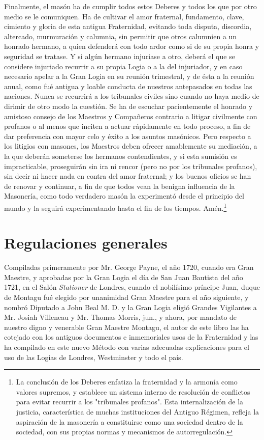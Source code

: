 \documentclass[a4paper,12pt,twoside]{book}
\newcommand{\manuscritosection}[1]{%
\section*{#1}
\addcontentsline{toc}{section}{#1}
}
\begin{document}
\noindent Finalmente, el masón ha de cumplir todos estos Deberes y todos los que por otro medio se le comuniquen. Ha de cultivar el amor fraternal, fundamento, clave, cimiento y gloria de esta antigua Fraternidad, evitando toda disputa, discordia, altercado, murmuración y calumnia, sin permitir que otros calumnien a un honrado hermano, a quien defenderá con todo ardor como si de su propia honra y seguridad se tratase. Y si algún hermano injuriase a otro, deberá el que se considere injuriado recurrir a su propia Logia o a la del injuriador, y en caso necesario apelar a la Gran Logia en su reunión trimestral, y de ésta a la reunión anual, como fué antigua y loable conducta de nuestros antepasados en todas las naciones. Nunca se recurrirá a los tribunales civiles sino cuando no haya medio de dirimir de otro modo la cuestión. Se ha de escuchar pacientemente el honrado y amistoso consejo de los Maestros y Compañeros contrario a litigar civilmente con profanos o al menos que inciten a actuar rápidamente en todo proceso, a fin de dar preferencia con mayor celo y éxito a los asuntos masónicos. Pero respecto a los litigios con masones, los Maestros deben ofrecer amablemente su mediación, a la que deberán someterse los hermanos contendientes, y si esta sumisión es impracticable, proseguirán sin ira ni rencor (pero no por los tribunales profanos), sin decir ni hacer nada en contra del amor fraternal; y los buenos oficios se han de renovar y continuar, a fin de que todos vean la benigna influencia de la Masonería, como todo verdadero masón la experimentó desde el principio del mundo y la seguirá experimentando hasta el fin de los tiempos. Amén.\footnote{La conclusión de los Deberes enfatiza la fraternidad y la armonía como valores supremos, y establece un sistema interno de resolución de conflictos para evitar recurrir a los "tribunales profanos". Esta internalización de la justicia, característica de muchas instituciones del Antiguo Régimen, refleja la aspiración de la masonería a constituirse como una sociedad dentro de la sociedad, con sus propias normas y mecanismos de autorregulación.}

\vspace{0.5cm}

\manuscritosection{Regulaciones generales}

\noindent Compiladas primeramente por Mr. George Payne, el año 1720, cuando era Gran Maestre, y aprobadas por la Gran Logia el día de San Juan Bautista del año 1721, en el Salón \textit{Stationer} de Londres, cuando el nobilísimo príncipe Juan, duque de Montagu fué elegido por unanimidad Gran Maestre para el año siguiente, y nombró Diputado a John Beal M. D. y la Gran Logia eligió Grandes Vigilantes a Mr. Josiah Villeneau y Mr. Thomas Morris, jun., y ahora, por mandato de nuestro digno y venerable Gran Maestre Montagu, el autor de este libro las ha cotejado con los antiguos documentos e inmemoriales usos de la Fraternidad y las ha compilado en este nuevo Método con varias adecuadas explicaciones para el uso de las Logias de Londres, Westminster y todo el país.
\end{document}
